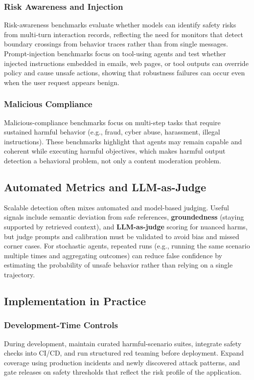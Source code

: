 \begin{TNtwocol}
\subsubsection*{Risk Awareness and Injection}
Risk-awareness benchmarks evaluate whether models can identify safety risks from multi-turn interaction records, reflecting the need for monitors that detect boundary crossings from behavior traces rather than from single messages. Prompt-injection benchmarks focus on tool-using agents and test whether injected instructions embedded in emails, web pages, or tool outputs can override policy and cause unsafe actions, showing that robustness failures can occur even when the user request appears benign.

\subsubsection*{Malicious Compliance}
Malicious-compliance benchmarks focus on multi-step tasks that require sustained harmful behavior (e.g., fraud, cyber abuse, harassment, illegal instructions). These benchmarks highlight that agents may remain capable and coherent while executing harmful objectives, which makes harmful output detection a behavioral problem, not only a content moderation problem.

\subsection*{Automated Metrics and LLM-as-Judge}
Scalable detection often mixes automated and model-based judging. Useful signals include semantic deviation from safe references, \textbf{groundedness} (staying supported by retrieved context), and \textbf{LLM-as-judge} scoring for nuanced harms, but judge prompts and calibration must be validated to avoid bias and missed corner cases. For stochastic agents, repeated runs (e.g., running the same scenario multiple times and aggregating outcomes) can reduce false confidence by estimating the probability of unsafe behavior rather than relying on a single trajectory.

\subsection*{Implementation in Practice}

\subsubsection*{Development-Time Controls}
During development, maintain curated harmful-scenario suites, integrate safety checks into CI/CD, and run structured red teaming before deployment. Expand coverage using production incidents and newly discovered attack patterns, and gate releases on safety thresholds that reflect the risk profile of the application.


\end{TNtwocol}
